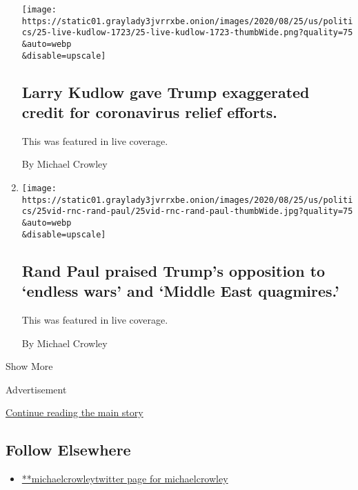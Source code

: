 \begin{enumerate}
  \texttt{[image: https://static01.graylady3jvrrxbe.onion/images/2020/08/25/us/politics/25-live-kudlow-1723/25-live-kudlow-1723-thumbWide.png?quality=75\\\&auto=webp\\\&disable=upscale]}

  \hypertarget{larry-kudlow-gave-trump-exaggerated-credit-for-coronavirus-relief-efforts}{%
  \subsection{Larry Kudlow gave Trump exaggerated credit for coronavirus
  relief
  efforts.}\label{larry-kudlow-gave-trump-exaggerated-credit-for-coronavirus-relief-efforts}}

  This was featured in live coverage.

  By Michael Crowley
\item
  \href{/live/2020/08/25/us/rnc-convention-election/rand-paul-praised-trumps-opposition-to-endless-wars-and-middle-east-quagmires}{}

  \texttt{[image: https://static01.graylady3jvrrxbe.onion/images/2020/08/25/us/politics/25vid-rnc-rand-paul/25vid-rnc-rand-paul-thumbWide.jpg?quality=75\\\&auto=webp\\\&disable=upscale]}

  \hypertarget{rand-paul-praised-trumps-opposition-to-endless-wars-and-middle-east-quagmires}{%
  \subsection{Rand Paul praised Trump's opposition to `endless wars' and
  `Middle East
  quagmires.'}\label{rand-paul-praised-trumps-opposition-to-endless-wars-and-middle-east-quagmires}}

  This was featured in live coverage.

  By Michael Crowley
\end{enumerate}

Show More

Advertisement

\protect\hyperlink{after-mid2}{Continue reading the main story}

\hypertarget{follow-elsewhere}{%
\subsection{Follow Elsewhere}\label{follow-elsewhere}}

\begin{itemize}
\tightlist
\item
  \href{https://twitter.com/michaelcrowley}{**michaelcrowleytwitter page
  for michaelcrowley}
\end{itemize}

